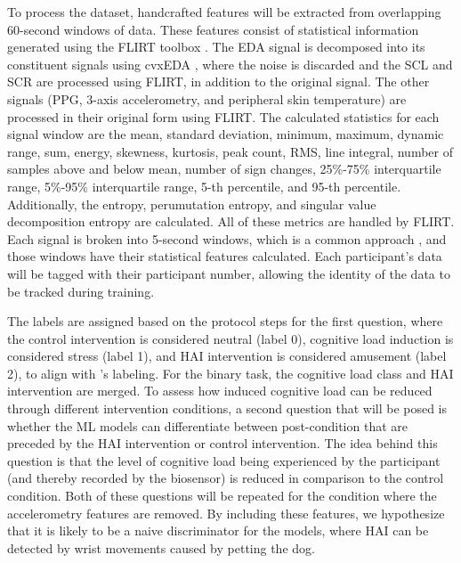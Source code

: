 \documentclass[12pt]{iopart}
\begin{document}
To process the dataset, handcrafted features will be extracted from overlapping 60-second windows of data.  These features consist of statistical information generated using the FLIRT toolbox \cite{foll2021flirt}.  The EDA signal is decomposed into its constituent signals using cvxEDA \cite{greco2015cvxeda}, where the noise is discarded and the SCL and SCR are processed using FLIRT, in addition to the original signal.  The other signals (PPG, 3-axis accelerometry, and peripheral skin temperature) are processed in their original form using FLIRT.  The calculated statistics for each signal window are the mean, standard deviation, minimum, maximum, dynamic range, sum, energy, skewness, kurtosis, peak count, RMS, line integral, number of samples above and below mean, number of sign changes, 25\%-75\% interquartile range, 5\%-95\% interquartile range, 5-th percentile, and 95-th percentile.  Additionally, the entropy, perumutation entropy, and singular value decomposition entropy are calculated.  All of these metrics are handled by FLIRT\cite{foll2021flirt}. Each signal is broken into 5-second windows, which is a common approach \cite{schmidt2018introducing, phippsassessing}, and those windows have their statistical features calculated.  Each participant's data will be tagged with their participant number, allowing the identity of the data to be tracked during training. 

The labels are assigned based on the protocol steps for the first question, where the control intervention is considered neutral (label 0), cognitive load induction is considered stress (label 1), and HAI intervention is considered amusement (label 2), to align with \cite{schmidt2018introducing}'s labeling.  For the binary task, the cognitive load class and HAI intervention are merged.  To assess how induced cognitive load can be reduced through different intervention conditions, a second question that will be posed is whether the ML models can differentiate between post-condition that are preceded by the HAI intervention or control intervention.  The idea behind this question is that the level of cognitive load being experienced by the participant (and thereby recorded by the biosensor) is reduced in comparison to the control condition.  Both of these questions will be repeated for the condition where the accelerometry features are removed.  By including these features, we hypothesize that it is likely to be a naive discriminator for the models, where HAI can be detected by wrist movements caused by petting the dog.
\end{document}
